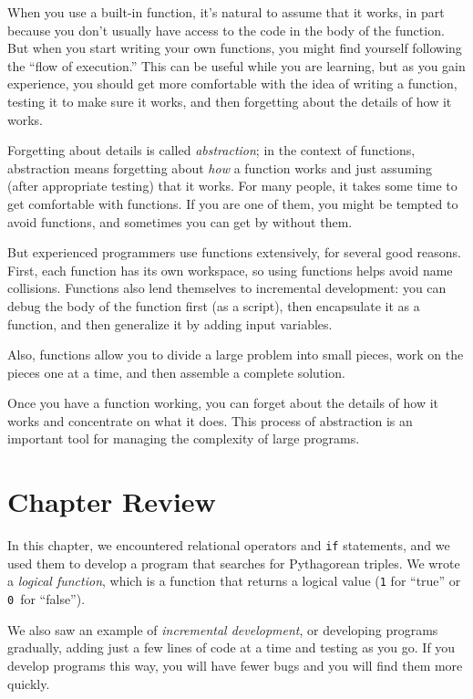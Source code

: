 When you use a built-in function, it's natural to assume that it works, in part because you don't
usually have access to the code in the body of the function.
But when you start writing your own functions, you might
find yourself following the ``flow of execution.''  This can
be useful while you are learning, but as you gain experience, you
should get more comfortable with the idea of writing a function,
testing it to make sure it works, and then forgetting about the
details of how it works.


Forgetting about details is called \emph{abstraction}; in the context
of functions, abstraction means forgetting about \emph{how} a function
works and just assuming (after appropriate testing) that it works.
For many people, it takes some time to get comfortable with functions.  If you are one of them, you might be tempted to avoid functions, and sometimes you can get by without them.

But experienced programmers use functions extensively, for several good reasons. First, each function has its own workspace, so using functions helps
avoid name collisions.
Functions also lend themselves to incremental development: you can
debug the body of the function first (as a script), then encapsulate
it as a function, and then generalize it by adding input variables.

Also, functions allow you to divide a large problem into small
pieces, work on the pieces one at a time, and then assemble a
complete solution.

Once you have a function working, you can forget about the
details of how it works and concentrate on what it does.  This
process of abstraction is an important tool for managing the
complexity of large programs.


\section{Chapter Review}

In this chapter, we encountered relational operators and \lstinline{if} statements, and we used them to develop a program that searches for Pythagorean triples.
We wrote a \emph{logical function}, which is a function that returns a logical value
(\lstinline{1} for ``true'' or \lstinline{0}~for ``false'').

We also saw an example of \emph{incremental development}, or developing programs gradually, adding just a few lines of code at a time and testing as you go.  If you develop programs this way, you will have fewer bugs and you will find them more quickly.

